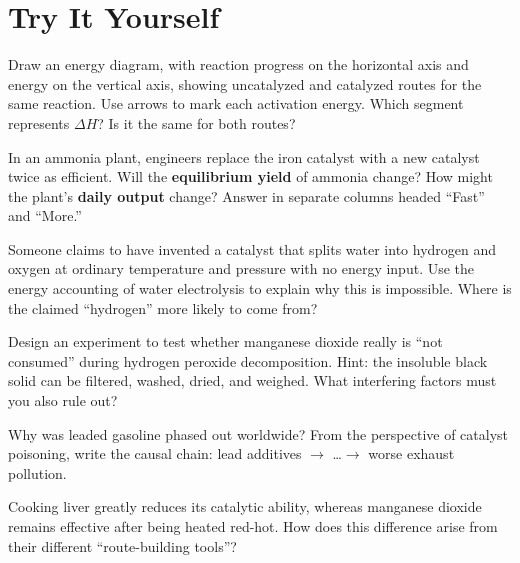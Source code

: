 \section*{Try It Yourself}

\begin{sikaoti}
\item Draw an energy diagram, with reaction progress on the horizontal axis and energy on the vertical axis, showing uncatalyzed and catalyzed routes for the same reaction. Use arrows to mark each activation energy. Which segment represents $\Delta H$? Is it the same for both routes?
\item In an ammonia plant, engineers replace the iron catalyst with a new catalyst twice as efficient. Will the \textbf{equilibrium yield} of ammonia change? How might the plant's \textbf{daily output} change? Answer in separate columns headed ``Fast'' and ``More.''
\item Someone claims to have invented a catalyst that splits water into hydrogen and oxygen at ordinary temperature and pressure with no energy input. Use the energy accounting of water electrolysis to explain why this is impossible. Where is the claimed ``hydrogen'' more likely to come from?
\item Design an experiment to test whether manganese dioxide really is ``not consumed'' during hydrogen peroxide decomposition. Hint: the insoluble black solid can be filtered, washed, dried, and weighed. What interfering factors must you also rule out?
\item Why was leaded gasoline phased out worldwide? From the perspective of catalyst poisoning, write the causal chain: lead additives $\rightarrow$ \dots $\rightarrow$ worse exhaust pollution.
\item Cooking liver greatly reduces its catalytic ability, whereas manganese dioxide remains effective after being heated red-hot. How does this difference arise from their different ``route-building tools''?
\end{sikaoti}
